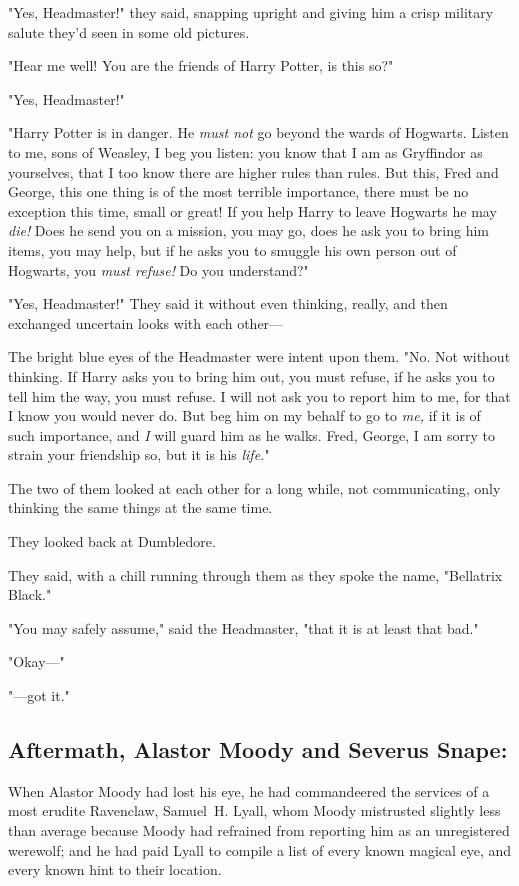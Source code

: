 "Yes, Headmaster!" they said, snapping upright and giving him a crisp military
salute they'd seen in some old pictures.

"Hear me well! You are the friends of Harry Potter, is this so?"

"Yes, Headmaster!"

"Harry Potter is in danger. He \emph{must not} go beyond the wards of Hogwarts.
Listen to me, sons of Weasley, I beg you listen: you know that I am as
Gryffindor as yourselves, that I too know there are higher rules than rules.
But this, Fred and George, this one thing is of the most terrible importance,
there must be no exception this time, small or great! If you help Harry to
leave Hogwarts he may \emph{die!} Does he send you on a mission, you may go,
does he ask you to bring him items, you may help, but if he asks you to smuggle
his own person out of Hogwarts, you \emph{must refuse!} Do you understand?"

"Yes, Headmaster!" They said it without even thinking, really, and then
exchanged uncertain looks with each other---

The bright blue eyes of the Headmaster were intent upon them. "No. Not without
thinking. If Harry asks you to bring him out, you must refuse, if he asks you
to tell him the way, you must refuse. I will not ask you to report him to me,
for that I know you would never do. But beg him on my behalf to go to
\emph{me,} if it is of such importance, and \emph{I} will guard him as he
walks. Fred, George, I am sorry to strain your friendship so, but it is his
\emph{life.}"

The two of them looked at each other for a long while, not communicating, only
thinking the same things at the same time.

They looked back at Dumbledore.

They said, with a chill running through them as they spoke the name, "Bellatrix
Black."

"You may safely assume," said the Headmaster, "that it is at least that bad."

"Okay---"

"---got it."
\sbreak
\subsection{Aftermath, Alastor Moody and Severus Snape:}

When Alastor Moody had lost his eye, he had commandeered the services of a most
erudite Ravenclaw, Samuel~H. Lyall, whom Moody mistrusted slightly less than
average because Moody had refrained from reporting him as an unregistered
werewolf; and he had paid Lyall to compile a list of every known magical eye,
and every known hint to their location.

